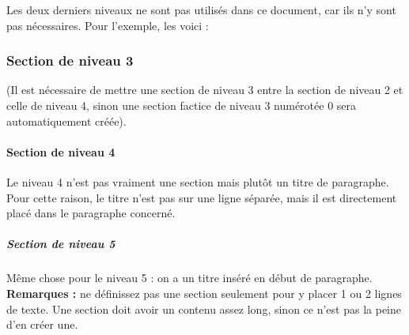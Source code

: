 \documentclass{ceri}
\begin{document}
Les deux derniers niveaux ne sont pas utilisés dans ce document, car ils n'y sont pas nécessaires. Pour l'exemple, les voici :
\subsubsection{Section de niveau 3}
(Il est nécessaire de mettre une section de niveau 3 entre la section de niveau 2 et celle de niveau 4, sinon une section factice de niveau 3 numérotée 0 sera automatiquement créée).
\paragraph{Section de niveau 4}
Le niveau 4 n'est pas vraiment une section mais plutôt un titre de paragraphe. Pour cette raison, le titre n'est pas sur une ligne séparée, mais il est directement placé dans le paragraphe concerné.
\subparagraph{Section de niveau 5}
Même chose pour le niveau 5 : on a un titre inséré en début de paragraphe.
\textbf{Remarques :} ne définissez pas une section seulement pour y placer 1 ou 2 lignes de texte. Une section doit avoir un contenu assez long, sinon ce n'est pas la peine d'en créer une.
\end{document}
